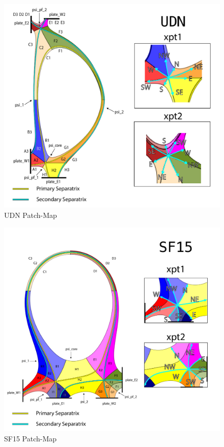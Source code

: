 \begin{figure}[H]
    \centering
        \includegraphics[width=\textwidth]{figures/configurations/UDN_collection.pdf}
        \caption{UDN Patch-Map}
        \label{fig:udn_patch_map}
\end{figure}
\begin{figure}[H]
    \centering
        \includegraphics[width=\textwidth]{figures/configurations/SF15_collection.pdf}
        \caption{SF15 Patch-Map}
        \label{fig:sf15_patch_map}
\end{figure}
